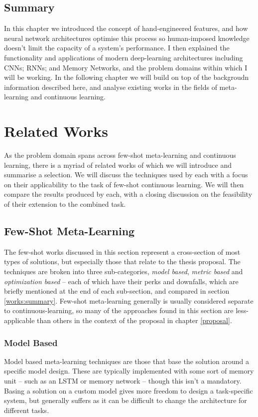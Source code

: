 \documentclass{report}
\begin{document}
	\section{Summary}
	In this chapter we introduced the concept of hand-engineered features, and how neural network architectures optimise this process so human-imposed knowledge doesn't limit the capacity of a system's performance. I then explained the functionality and applications of modern deep-learning architectures including CNNs; RNNs; and Memory Networks, and the problem domains within which I will be working. In the following chapter we will build on top of the backgroudn information described here, and analyse existing works in the fields of meta-learning and continuous learning. \par
	
	\chapter{Related Works} \label{related:1}
	As the problem domain spans across few-shot meta-learning and continuous learning, there is a myriad of related works of which we will introduce and summarise a selection. We will discuss the techniques used by each with a focus on their applicability to the task of few-shot continuous learning. We will then compare the results produced by each, with a closing discussion on the feasibility of their extension to the combined task. \par

	\section{Few-Shot Meta-Learning}
	The few-shot works discussed in this section represent a cross-section of most types of solutions, but especially those that relate to the thesis proposal. The techniques are broken into three sub-categories, \emph{model based}, \emph{metric based} and \emph{optimization based} -- each of which have their perks and downfalls, which are briefly mentioned at the end of each sub-section, and compared in section \ref{works:summary}. Few-shot meta-learning generally is usually considered separate to continuous-learning, so many of the approaches found in this section are less-applicable than others in the context of the proposal in chapter \ref{proposal}.

	\subsection{Model Based} \label{related-meta-modl:1}
	Model based meta-learning techniques are those that base the solution around a specific model design. These are typically implemented with some sort of memory unit -- such as an LSTM or memory network -- though this isn't a mandatory. Basing a solution on a custom model gives more freedom to design a task-specific system, but generally suffers as it can be difficult to change the architecture for different tasks. \par
	
\end{document}

